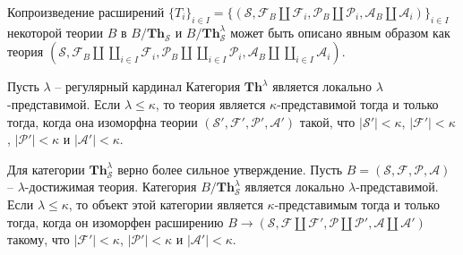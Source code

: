 \documentclass[reqno]{amsart}
\theoremstyle{definition}
\theoremstyle{remark}
\newcommand{\bcat}[1]{\mathbf{#1}}
\newcommand{\Th}{\bcat{Th}}
\begin{document}
\begin{remark}[th-coproducts]
Копроизведение расширений $\{ T_i \}_{i \in I} = \{ (\mathcal{S}, \mathcal{F}_B \amalg \mathcal{F}_i, \mathcal{P}_B \amalg \mathcal{P}_i, \mathcal{A}_B \amalg \mathcal{A}_i) \}_{i \in I}$
некоторой теории $B$ в $B/\Th_\mathcal{S}$ и $B/\Th_\mathcal{S}^\lambda$ может быть описано явным образом как теория
$(\mathcal{S}, \mathcal{F}_B \amalg \coprod\limits_{i \in I} \mathcal{F}_i, \mathcal{P}_B \amalg \coprod\limits_{i \in I} \mathcal{P}_i, \mathcal{A}_B \amalg \coprod\limits_{i \in I} \mathcal{A}_i)$.
\end{remark}

\begin{prop}[th-pres]
Пусть $\lambda$ -- регулярный кардинал
Категория $\Th^\lambda$ является локально $\lambda$-представимой.
Если $\lambda \leq \kappa$, то теория является $\kappa$-представимой тогда и только тогда,
когда она изоморфна теории $(\mathcal{S}',\mathcal{F}',\mathcal{P}',\mathcal{A}')$ такой, что $|\mathcal{S}'| < \kappa$, $|\mathcal{F}'| < \kappa$, $|\mathcal{P}'| < \kappa$ и $|\mathcal{A}'| < \kappa$.

Для категории $\Th_\mathcal{S}^\lambda$ верно более сильное утверждение.
Пусть $B = (\mathcal{S},\mathcal{F},\mathcal{P},\mathcal{A})$ -- $\lambda$-достижимая теория.
Категория $B/\Th_\mathcal{S}^\lambda$ является локально $\lambda$-представимой.
Если $\lambda \leq \kappa$, то объект этой категории является $\kappa$-представимым тогда и только тогда,
когда он изоморфен расширению $B \to (\mathcal{S}, \mathcal{F} \amalg \mathcal{F}', \mathcal{P} \amalg \mathcal{P}', \mathcal{A} \amalg \mathcal{A}')$ такому, что $|\mathcal{F}'| < \kappa$, $|\mathcal{P}'| < \kappa$ и $|\mathcal{A}'| < \kappa$.
\end{prop}
\end{document}
